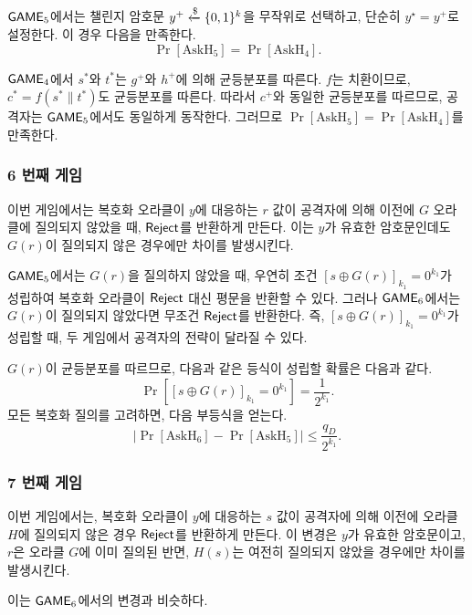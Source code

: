 $\textsf{GAME}_5$에서는 챌린지 암호문 $y^+ \xleftarrow{\$} \{0,1\}^k$을 무작위로 선택하고, 단순히
$y^\star = y^+$로 설정한다. 이 경우 다음을 만족한다.
$$
	\Pr[\text{AskH}_5] = \Pr[\text{AskH}_4].
$$

\begin{memo}
	$\textsf{GAME}_4$에서 $s^*$와 $t^*$는 $g^+$와 $h^+$에 의해 균등분포를 따른다. $f$는
	치환이므로, $c^* = f(s^* \parallel t^*)$도 균등분포를 따른다. 따라서 $c^+$와
	동일한 균등분포를 따르므로, 공격자는 $\textsf{GAME}_5$에서도 동일하게 동작한다.
	그러므로 $\Pr[\text{AskH}_5] = \Pr[\text{AskH}_4]$를 만족한다.
\end{memo}

\newpage
\subsubsection{6 번째 게임}

이번 게임에서는 복호화 오라클이 $y$에 대응하는 $r$ 값이 공격자에 의해 이전에 $G$
오라클에 질의되지 않았을 때, $\textsf{Reject}$를 반환하게 만든다. 이는 $y$가 유효한
암호문인데도 $G(r)$이 질의되지 않은 경우에만 차이를 발생시킨다. 

\begin{memo}
	$\textsf{GAME}_5$에서는 $G(r)$을 질의하지 않았을 때, 우연히 조건 $[s \oplus
	G(r)]_{k_1} = 0^{k_1}$가 성립하여 복호화 오라클이 $\textsf{Reject}$ 대신 평문을
	반환할 수 있다. 그러나 $\textsf{GAME}_6$에서는 $G(r)$이 질의되지 않았다면 무조건
	$\textsf{Reject}$를 반환한다. 즉, $[s \oplus G(r)]_{k_1} = 0^{k_1}$가 성립할 때, 두
	게임에서 공격자의 전략이 달라질 수 있다.
\end{memo}

$G(r)$이 균등분포를 따르므로, 다음과 같은 등식이 성립할 확률은 다음과 같다.
$$
	\Pr[[s \oplus G(r)]_{k_1} = 0^{k_1}] = \frac{1}{2^{k_1}}.
$$
모든 복호화 질의를 고려하면, 다음 부등식을 얻는다.
$$	
	\left| \Pr[\text{AskH}_6] - \Pr[\text{AskH}_5] \right| \leq \frac{q_D}{2^{k_1}}.
$$

\subsubsection{7 번째 게임}

이번 게임에서는, 복호화 오라클이 $y$에 대응하는 $s$ 값이 공격자에 의해 이전에
오라클 $H$에 질의되지 않은 경우 $\textsf{Reject}$를 반환하게 만든다. 이 변경은 $y$가
유효한 암호문이고, $r$은 오라클 $G$에 이미 질의된 반면, $H(s)$는 여전히 질의되지
않았을 경우에만 차이를 발생시킨다.

\begin{memo}
	이는 $\textsf{GAME}_6$에서의 변경과 비슷하다.
\end{memo}

